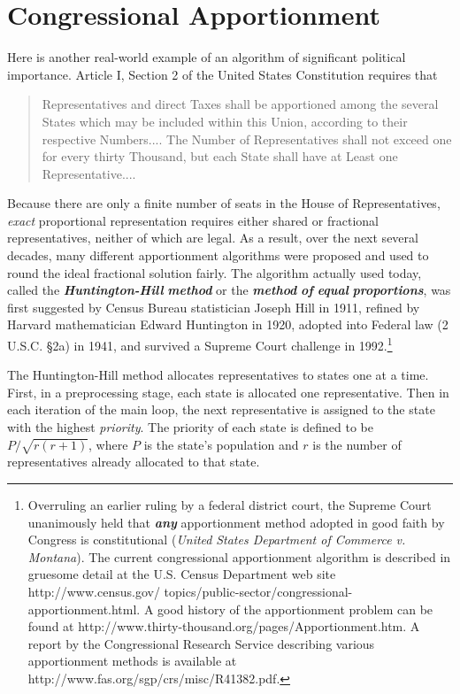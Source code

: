 \section{Congressional Apportionment}
\label{sec:0.3}

Here is another real-world example of an algorithm of significant political importance. Article I, Section 2 of the United States Constitution requires that

\begin{quote}
\sffamily\fontsize{9}{12}\selectfont
Representatives and direct Taxes shall be apportioned among the several
States which may be included within this Union, according to their respective
Numbers.... The Number of Representatives shall not exceed one for every
thirty Thousand, but each State shall have at Least one Representative....
\end{quote}
Because there are only a finite number of seats in the House of Representatives, \textit{exact} proportional representation requires either shared or fractional representatives, neither of which are legal. As a result, over the next several decades, many different apportionment algorithms were proposed and used to round the ideal fractional solution fairly. The algorithm actually used today, called the \textbf{\textit{Huntington-Hill}} \textbf{\textit{method}} or the \textbf{\textit{method}} \textbf{\textit{of}} \textbf{\textit{equal}} \textbf{\textit{proportions}}, was first suggested by Census Bureau statistician Joseph Hill in 1911, refined by Harvard mathematician Edward Huntington in 1920, adopted into Federal law (2 U.S.C. §2a) in 1941, and survived a Supreme Court challenge in 1992.\footnote{Overruling an earlier ruling by a federal district court, the Supreme Court unanimously held that \textbf{\textit{any}} apportionment method adopted in good faith by Congress is constitutional (\textit{United} \textit{States Department of Commerce v. Montana}). The current congressional apportionment algorithm is described in gruesome detail at the U.S. Census Department web site http://www.census.gov/ topics/public-sector/congressional-apportionment.html. A good history of the apportionment problem can be found at http://www.thirty-thousand.org/pages/Apportionment.htm. A report by the Congressional Research Service describing various apportionment methods is available at http://www.fas.org/sgp/crs/misc/R41382.pdf.}

The Huntington-Hill method allocates representatives to states one at a time. First, in a preprocessing stage, each state is allocated one representative. Then in each iteration of the main loop, the next representative is assigned to the state with the highest \textit{priority}. The priority of each state is defined to be $P \big/ \sqrt{r(r+1)}$, where $P$ is the state’s population and $r$ is the number of representatives already allocated to that state.

